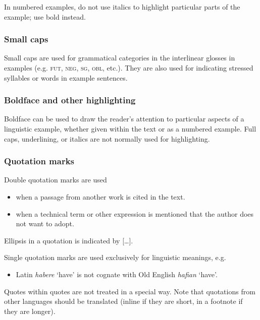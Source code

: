 \documentclass[charis,linguex,biblatex]{glossa}
\begin{document}
In numbered examples, do not use italics to highlight particular parts of the example; use bold instead.

\fussy

\subsubsection{Small caps} 

Small caps are used for grammatical categories in the interlinear glosses in examples (e.g. \textsc{fut, neg, sg, obl}, etc.). They are also used for indicating stressed syllables or words in example sentences. 

\subsubsection{Boldface and other highlighting}
Boldface can be used to draw the reader’s attention to particular aspects of a linguistic example, whether given within the text or as a numbered example. Full caps, underlining, or italics are not normally used for highlighting.

\subsubsection{Quotation marks}
Double quotation marks are used

\begin{itemize}
\item when a passage from another work is cited in the text.
\item when a technical term or other expression is mentioned that the author does not want to adopt.
\end{itemize}
Ellipsis in a quotation is indicated by [\ldots].

Single quotation marks are used exclusively for linguistic meanings, e.g.
\begin{itemize}
\item Latin \textit{habere} ‘have’ is not cognate with Old English \textit{hafian} ‘have’.
\end{itemize}
Quotes within quotes are not treated in a special way.
Note that quotations from other languages should be translated (inline if they are short, in a footnote if they are longer).
\end{document}

